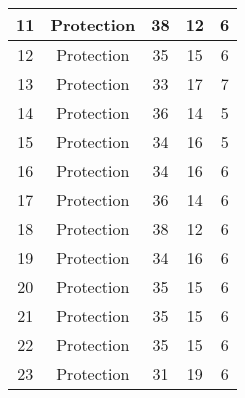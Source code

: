 \documentclass[results.tex]{subfiles}
\begin{document}
\begin{center}
\begin{tabular}{| c || c | c | c | c |}
            \hline
            11                      & Protection                   & 38                     & 12                      & 6                    \\
            \hline
            12                      & Protection                   & 35                     & 15                      & 6                    \\
            \hline
            13                      & Protection                   & 33                     & 17                      & 7                    \\
            \hline
            14                      & Protection                   & 36                     & 14                      & 5                    \\
            \hline
            15                      & Protection                   & 34                     & 16                      & 5                    \\
            \hline
            16                      & Protection                   & 34                     & 16                      & 6                    \\
            \hline
            17                      & Protection                   & 36                     & 14                      & 6                    \\
            \hline
            18                      & Protection                   & 38                     & 12                      & 6                    \\
            \hline
            19                      & Protection                   & 34                     & 16                      & 6                    \\
            \hline
            20                      & Protection                   & 35                     & 15                      & 6                    \\
            \hline
            21                      & Protection                   & 35                     & 15                      & 6                    \\
            \hline
            22                      & Protection                   & 35                     & 15                      & 6                    \\
            \hline
            23                      & Protection                   & 31                     & 19                      & 6                    \\

\end{tabular}
\end{center}
\end{document}
